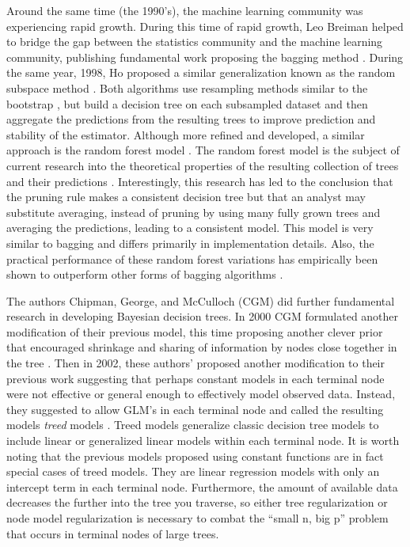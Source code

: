 Around the same time (the 1990's), the machine learning community was experiencing rapid growth. During this time of rapid growth, Leo Breiman helped to bridge the gap between the statistics community and the machine learning community, publishing fundamental work proposing the bagging method \cite{breiman1996bagging}. During the same year, 1998, Ho proposed a similar generalization known as the random subspace method \cite{ho1998random}. Both algorithms use resampling methods similar to the bootstrap \cite{efron1997improvements,efron1994introduction}, but build a decision tree on each subsampled dataset and then aggregate the predictions from the resulting trees to improve prediction and stability of the estimator. Although more refined and developed, a similar approach is the random forest model \cite{breiman2001random}. The random forest model is the subject of current research into the theoretical properties of the resulting collection of trees and their predictions \cite{biau2008consistency,biau2012analysis}. Interestingly, this research has led to the conclusion that the pruning rule makes a consistent decision tree but that an analyst may substitute averaging, instead of pruning by using many fully grown trees and averaging the predictions, leading to a consistent model.  This model is very similar to bagging and differs primarily in implementation details. Also, the practical performance of these random forest variations has empirically been shown to outperform other forms of bagging algorithms \cite{breiman2001random}. 

The authors Chipman, George, and McCulloch (CGM) \cite{chipman1998bayesian} did further fundamental research in developing Bayesian decision trees. In 2000 CGM formulated another modification of their previous model, this time proposing another clever prior that encouraged shrinkage and sharing of information by nodes close together in the tree \cite{chipman2000hierarchical}. Then in 2002, these authors' proposed another modification to their previous work suggesting that perhaps constant models in each terminal node were not effective or general enough to effectively model observed data. Instead, they suggested to allow GLM's in each terminal node and called the resulting models \emph{treed} models \cite{chipman2002bayesian}. Treed models generalize classic decision tree models to include linear or generalized linear models within each terminal node. It is worth noting that the previous models proposed using constant functions are in fact special cases of treed models. They are linear regression models with only an intercept term in each terminal node. Furthermore, the amount of available data decreases the further into the tree you traverse, so either tree regularization or node model regularization is necessary to combat the ``small n, big p'' problem that occurs in terminal nodes of large trees. 

